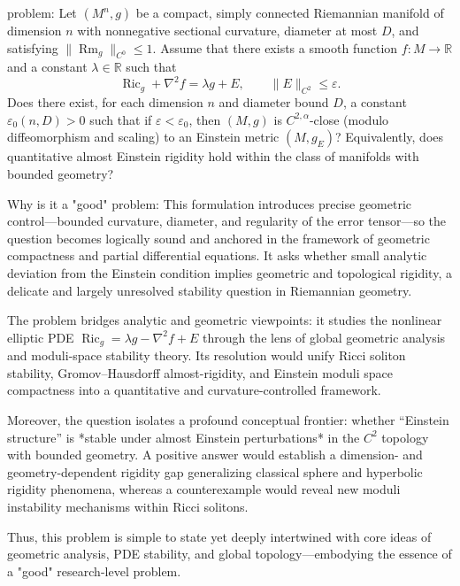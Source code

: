 problem:  
Let \((M^n, g)\) be a compact, simply connected Riemannian manifold of dimension \(n\) with nonnegative sectional curvature, diameter at most \(D\), and satisfying \(\| \operatorname{Rm}_g \|_{C^0} \leq 1\). Assume that there exists a smooth function \(f : M \to \mathbb{R}\) and a constant \(\lambda \in \mathbb{R}\) such that  
\[
\operatorname{Ric}_g + \nabla^2 f = \lambda g + E, \qquad \|E\|_{C^2} \leq \varepsilon.
\]  
Does there exist, for each dimension \(n\) and diameter bound \(D\), a constant \(\varepsilon_0(n, D) > 0\) such that if \(\varepsilon < \varepsilon_0\), then \((M,g)\) is \(C^{2,\alpha}\)-close (modulo diffeomorphism and scaling) to an Einstein metric \((M, g_E)\)? Equivalently, does quantitative almost Einstein rigidity hold within the class of manifolds with bounded geometry?  

Why is it a "good" problem:  
This formulation introduces precise geometric control—bounded curvature, diameter, and regularity of the error tensor—so the question becomes logically sound and anchored in the framework of geometric compactness and partial differential equations. It asks whether small analytic deviation from the Einstein condition implies geometric and topological rigidity, a delicate and largely unresolved stability question in Riemannian geometry.  

The problem bridges analytic and geometric viewpoints: it studies the nonlinear elliptic PDE \(\operatorname{Ric}_g = \lambda g - \nabla^2 f + E\) through the lens of global geometric analysis and moduli-space stability theory. Its resolution would unify Ricci soliton stability, Gromov–Hausdorff almost-rigidity, and Einstein moduli space compactness into a quantitative and curvature-controlled framework.  

Moreover, the question isolates a profound conceptual frontier: whether “Einstein structure” is *stable under almost Einstein perturbations* in the \(C^2\) topology with bounded geometry. A positive answer would establish a dimension- and geometry-dependent rigidity gap generalizing classical sphere and hyperbolic rigidity phenomena, whereas a counterexample would reveal new moduli instability mechanisms within Ricci solitons.  

Thus, this problem is simple to state yet deeply intertwined with core ideas of geometric analysis, PDE stability, and global topology—embodying the essence of a "good" research-level problem.